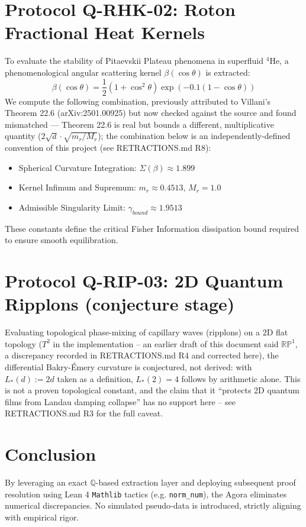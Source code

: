 \documentclass[11pt,a4paper]{article}
\begin{document}
\section{Protocol Q-RHK-02: Roton Fractional Heat Kernels}
To evaluate the stability of Pitaevskii Plateau phenomena in superfluid $^4$He, a phenomenological angular scattering kernel $\beta(\cos\theta)$ is extracted:
\begin{equation}
    \beta(\cos \theta) = \frac{1}{2} (1 + \cos^2\theta) \exp(-0.1(1-\cos\theta))
\end{equation}
We compute the following combination, previously attributed to Villani's Theorem 22.6
(arXiv:2501.00925) but now checked against the source and found mismatched --- Theorem 22.6
is real but bounds a different, multiplicative quantity ($2\sqrt{d}\cdot\sqrt{m_r/M_r}$); the
combination below is an independently-defined convention of this project (see RETRACTIONS.md R8):
\begin{itemize}
    \item Spherical Curvature Integration: $\Sigma(\beta) \approx 1.899$
    \item Kernel Infimum and Supremum: $m_r \approx 0.4513$, $M_r = 1.0$
    \item Admissible Singularity Limit: $\gamma_{bound} \approx 1.9513$
\end{itemize}
These constants define the critical Fisher Information dissipation bound required to ensure smooth equilibration.

\section{Protocol Q-RIP-03: 2D Quantum Ripplons (conjecture stage)}
Evaluating topological phase-mixing of capillary waves (ripplons) on a $2$D flat topology ($T^2$ in
the implementation -- an earlier draft of this document said $\mathbb{RP}^1$, a discrepancy recorded
in RETRACTIONS.md R4 and corrected here), the differential Bakry-\'Emery curvature is conjectured,
not derived: with $L_*(d) := 2d$ taken as a definition, $L_*(2) = 4$ follows by arithmetic alone. This
is not a proven topological constant, and the claim that it ``protects 2D quantum films from Landau
damping collapse'' has no support here -- see RETRACTIONS.md R3 for the full caveat.

\section{Conclusion}
By leveraging an exact $\mathbb{Q}$-based extraction layer and deploying subsequent proof resolution using Lean 4 \texttt{Mathlib} tactics (e.g. \texttt{norm\_num}), the Agora eliminates numerical discrepancies. No simulated pseudo-data is introduced, strictly aligning with empirical rigor.
\end{document}

